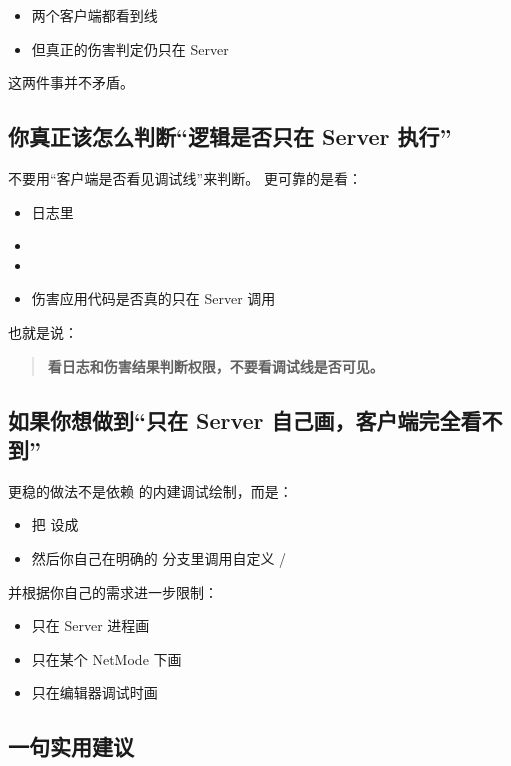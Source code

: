 \begin{itemize}
	\item 两个客户端都看到线
	\item 但真正的伤害判定仍只在 Server
\end{itemize}

这两件事并不矛盾。

\subsection{你真正该怎么判断“逻辑是否只在 Server 执行”}

不要用“客户端是否看见调试线”来判断。  
更可靠的是看：

\begin{itemize}
	\item 日志里 
	\item {}
	\item {}
	\item 伤害应用代码是否真的只在 Server 调用
\end{itemize}

也就是说：

\begin{quote}
	\textbf{看日志和伤害结果判断权限，不要看调试线是否可见。}
\end{quote}

\subsection{如果你想做到“只在 Server 自己画，客户端完全看不到”}

更稳的做法不是依赖  的内建调试绘制，而是：

\begin{itemize}
	\item 把  设成 
	\item 然后你自己在明确的  分支里调用自定义  / 
\end{itemize}

并根据你自己的需求进一步限制：

\begin{itemize}
	\item 只在 Server 进程画
	\item 只在某个 NetMode 下画
	\item 只在编辑器调试时画
\end{itemize}

\subsection{一句实用建议}

